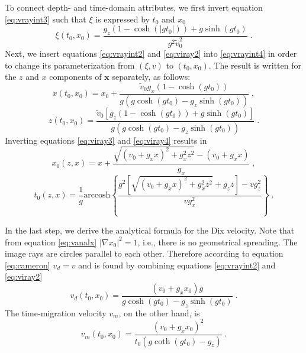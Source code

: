 To connect depth- and time-domain attributes, we first invert equation \ref{eq:vrayint3} such that $\xi$ is 
expressed by $t_0$ and $x_0$
\begin{equation}
\label{eq:viray2}
\xi (t_0,x_0) = \frac{g_z (1 - \cosh (|g t_0|))
+ g \sinh (g t_0)}{g^2 \tilde{v}_0^2}\;.
\end{equation}
Next, we insert equations \ref{eq:vrayint2} and \ref{eq:viray2} into \ref{eq:vrayint4} in order to change its 
parameterization from $(\xi,v)$ to $(t_0,x_0)$. The result is written for the $z$ and $x$ components of 
$\mathbf{x}$ separately, as follows:
\begin{equation}
\label{eq:viray3}
x (t_0,x_0) = x_0 + \frac{\tilde{v}_0 g_x (1 - \cosh (g t_0))}{g (g \cosh (g t_0) - g_z \sinh (g t_0))}\;,
\end{equation}
\begin{equation}
\label{eq:viray4}
z (t_0,x_0) = \frac{\tilde{v}_0 \left[ g_z (1 - \cosh (g t_0)) + g \sinh (g t_0) \right]}
{g (g \cosh (g t_0) - g_z \sinh (g t_0))}\;.
\end{equation}
Inverting equations \ref{eq:viray3} and \ref{eq:viray4} results in
\begin{equation}
\label{eq:vanalx}
x_0 (z,x) = x + \frac{\sqrt{(v_0 + g_x x)^2 + g_x^2 z^2} - (v_0 + g_x x)}{g_x}\;,
\end{equation}
\begin{equation}
\label{eq:vanalt}
t_0 (z,x) = \frac{1}{g} \mathrm{arccosh} \left\{ \frac{g^2 \left[ \sqrt{(v_0 + g_x x)^2 + g_x^2 z^2}
+ g_z z \right] - v g_z^2}{v g_x^2} \right\}\;.
\end{equation}

In the last step, we derive the analytical formula for the Dix velocity. Note that from equation 
\ref{eq:vanalx} $|\nabla x_0|^2 = 1$, i.e., there is no geometrical spreading. The image rays are circles parallel 
to each other. Therefore according to equation \ref{eq:cameron} $v_d = v$ and is found by combining equations 
\ref{eq:vrayint2} and \ref{eq:viray2}
\begin{equation}
\label{eq:vanalvd}
v_d (t_0,x_0) = \frac{(v_0 + g_x x_0) g}{g \cosh (g t_0) - g_z \sinh (g t_0)}\;.
\end{equation}
The time-migration velocity $v_m$, on the other hand, is
\begin{equation}
\label{eq:vanalvm}
v_m (t_0,x_0) = \frac{(v_0 + g_x x_0)^2}{t_0 ( g \coth (g t_0) - g_z )}\;.
\end{equation}

\appendix
